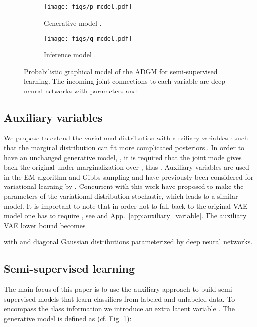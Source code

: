 \documentclass{article}
\begin{document}
\begin{figure}[h!]
  \centering
  	\begin{subfigure}{.22\textwidth}
	  \centering
      \texttt{[image: figs/p\_model.pdf]}
	  \caption{Generative model .}
	  \label{fig:p_model}
	\end{subfigure}
	\begin{subfigure}{.22\textwidth}
	  \centering
      \texttt{[image: figs/q\_model.pdf]}
	  \caption{Inference model .}
	  \label{fig:q_model}
	\end{subfigure}
     \vspace{-3mm}
	\caption{Probabilistic graphical model of the ADGM for semi-supervised learning. The incoming joint connections to each variable are deep neural networks with parameters  and .}
    \vspace{-4mm}
  \label{fig:models}
\end{figure}

\subsection{Auxiliary variables} \label{sec:aux}
We propose to extend the variational distribution with auxiliary variables :  such that the marginal distribution  can fit more complicated posteriors . In order to have an unchanged generative model, , it is required that the joint mode  gives back the original  under marginalization over , thus . Auxiliary variables are used in the EM algorithm and Gibbs sampling and have previously been considered for variational learning by \citet{Agakov04}. Concurrent with this work \citet{Ranganath2015} have proposed to make the parameters of the variational distribution stochastic, which leads to a similar model. It is important to note that in order not to fall back to the original VAE model one has to require , see \citet{Agakov04} and App.~\ref{app:auxiliary_variable}. The auxiliary VAE lower bound becomes 

with  and  diagonal Gaussian distributions parameterized by deep neural networks.

\subsection{Semi-supervised learning}
The main focus of this paper is to use the auxiliary approach to build semi-supervised models that learn classifiers from labeled and unlabeled data. To encompass the class information we introduce an extra latent variable . The generative model  is defined as  (cf. Fig. \ref{fig:p_model}):
\end{document}
